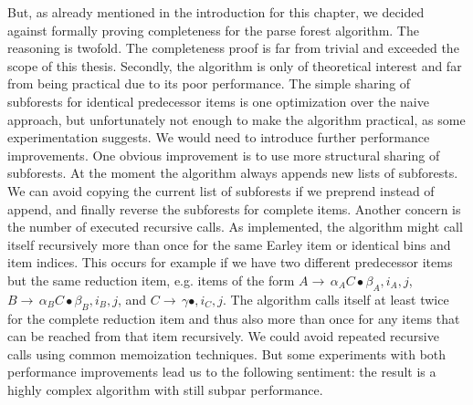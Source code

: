 \begin{isabellebody}
\begin{isamarkuptext}
But, as already mentioned in the introduction for this chapter, we decided against formally proving completeness for the parse forest algorithm. The
reasoning is twofold. The completeness proof is far from trivial and exceeded the scope of this thesis.
Secondly, the algorithm is only of theoretical interest and far from being practical due to its poor performance.
The simple sharing of subforests for identical predecessor items is one optimization over the naive approach, but unfortunately
not enough to make the algorithm practical, as some experimentation suggests. We would need to introduce
further performance improvements. One obvious improvement is to use more structural sharing of subforests.
At the moment the algorithm always appends new lists of subforests. We can avoid copying the current list
of subforests if we preprend instead of append, and finally reverse the subforests for complete items. 
Another concern is the number of executed recursive calls. As implemented, the algorithm might call itself recursively more than
once for the same Earley item or identical bins and item indices. This occurs for example if we have
two different predecessor items but the same reduction item, e.g. items of the form $A \rightarrow \, \alpha_A C \bullet \beta_A, i_A, j$,
$B \rightarrow \, \alpha_B C \bullet \beta_B, i_B, j$, and $C \rightarrow \, \gamma \bullet, i_C, j$. The algorithm calls itself at least twice for
the complete reduction item and thus also more than once for any items that can be reached from that item recursively. We could avoid repeated recursive calls using
common memoization techniques. But some experiments with both performance improvements lead us to the following sentiment: the result is a
highly complex algorithm with still subpar performance. 


\end{isamarkuptext}
\end{isabellebody}
